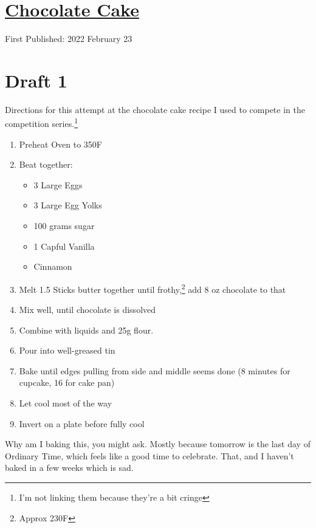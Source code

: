 \documentclass[12pt]{article}[titlepage]
\newcommand{\1}{\={a}}
\newcommand{\2}{\={e}}
\newcommand{\3}{\={\i}}
\newcommand{\4}{\=o}
\newcommand{\5}{\=u}
\newcommand{\6}{\={A}}
\renewcommand{\,}{\textsuperscript{,}}
\begin{document}
\doublespacing
\section{\href{chocolate-cake.html}{Chocolate Cake}}
First Published: 2022 February 23

\section{Draft 1}
Directions for this attempt at the chocolate cake recipe I used to compete in the competition series.\footnote{I'm not linking them because they're a bit cringe}

\begin{enumerate}
\item Preheat Oven to 350F
\item Beat together:
\begin{itemize}
\item 3 Large Eggs
\item 3 Large Egg Yolks
\item 100 grams sugar
\item 1 Capful Vanilla
\item Cinnamon
\end{itemize}
\item Melt 1.5 Sticks butter together until frothy,\footnote{Approx 230F} add 8 oz chocolate to that
\item Mix well, until chocolate is dissolved
\item Combine with liquids and 25g flour.
\item Pour into well-greased tin
\item Bake until edges pulling from side and middle seems done (8 minutes for cupcake, 16 for cake pan)
\item Let cool most of the way
\item Invert on a plate before fully cool
\end{enumerate}

Why am I baking this, you might ask.
Mostly because tomorrow is the last day of Ordinary Time, which feels like a good time to celebrate.
That, and I haven't baked in a few weeks which is sad.
\end{document}
